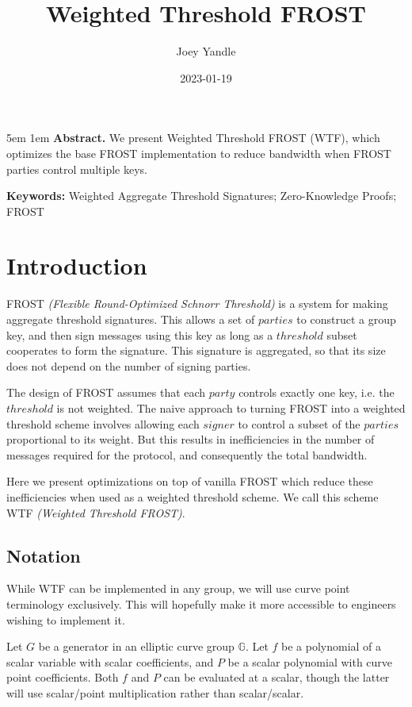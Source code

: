 \documentclass{article}
\title{Weighted Threshold FROST}
\date{2023-01-19}
\author{Joey Yandle}
\begin{document}
\onecolumn
\maketitle

\begingroup
\leftskip5em
\parskip1em
\rightskip\leftskip
\noindent\textbf{Abstract.} We present Weighted Threshold FROST (WTF), which optimizes the base FROST implementation to reduce bandwidth when FROST parties control multiple keys.

\par
\noindent\textbf{Keywords:} Weighted Aggregate Threshold Signatures; Zero-Knowledge Proofs; FROST
\par
\endgroup

\section{
  Introduction
}

FROST \emph{(Flexible Round-Optimized Schnorr Threshold)} \cite{frost} is a system for making aggregate threshold signatures.  This allows a set of $parties$ to construct a group key, and then sign messages using this key as long as a $threshold$ subset cooperates to form the signature.  This signature is aggregated, so that its size does not depend on the number of signing parties.

The design of FROST assumes that each $party$ controls exactly one key, i.e. the $threshold$ is not weighted.  The naive approach to turning FROST into a weighted threshold scheme involves allowing each $signer$ to control a subset of the $parties$ proportional to its weight.  But this results in inefficiencies in the number of messages required for the protocol, and consequently the total bandwidth.

Here we present optimizations on top of vanilla FROST which reduce these inefficiencies when used as a weighted threshold scheme.  We call this scheme WTF \emph{(Weighted Threshold FROST)}.

\subsection{
  Notation
}

While WTF can be implemented in any group, we will use curve point terminology exclusively.  This will hopefully make it more accessible to engineers wishing to implement it.

Let $G$ be a generator in an elliptic curve group $\mathbb{G}$.  Let $f$ be a polynomial of a scalar variable with scalar coefficients, and $P$ be a scalar polynomial with curve point coefficients.  Both $f$ and $P$ can be evaluated at a scalar, though the latter will use scalar/point multiplication rather than scalar/scalar.
\end{document}
